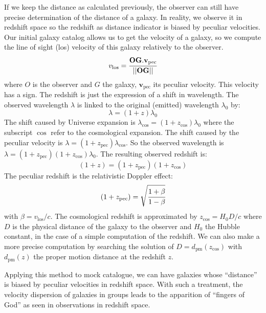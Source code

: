 If we keep the distance as calculated previously, the observer can still have
precise determination of the distance of a galaxy. In reality, we observe it in
redshift space so the redshift as distance indicator is biased by peculiar
velocities. Our initial galaxy catalog allows us to get the velocity of a
galaxy, so we compute the line of sight (los) velocity of this galaxy
relatively to the observer.
%
\begin{equation}
v_\mathrm{los}=\cfrac{\textbf{OG}.\textbf{v}_\mathrm{pec}}
    {\left|\left|\textbf{OG}\right|\right|}
\end{equation}
%
where $O$ is the observer and $G$ the galaxy, $\textbf{v}_{\mathrm{pec}}$ its
peculiar velocity. This velocity has a sign. The redshift is just the
expression of a shift in wavelength. The observed wavelength $\lambda$ is
linked to the original (emitted) wavelength $\lambda_0$ by:
%
\begin{equation}
    \lambda=(1+z)\lambda_0
\end{equation}
%
The shift caused by Universe expansion is
$\lambda_{\cos}=(1+z_{\cos})\lambda_0$ where the subscript $\cos$ refer to the
cosmological expansion. The shift caused by the peculiar velocity is
$\lambda=(1+z_{\mathrm{pec}})\lambda_{\cos}$. So the observed wavelength is
$\lambda=(1+z_{\mathrm{pec}})(1+z_{\cos})\lambda_0$. The resulting observed
redshift is:
%
\begin{equation}
    (1+z)=(1+z_{\mathrm{pec}})(1+z_{\cos})
\end{equation}
%
The peculiar redshift is the relativistic Doppler effect:
%
\begin{equation}
    (1+z_{\mathrm{pec}})=\sqrt{\cfrac{1+\beta}{1-\beta}}
\end{equation}
%
with $\beta={v_{\mathrm{los}}}/{c}$. The cosmological redshift is approximated
by $z_{\cos}={H_0}{D}/c$ where $D$ is the physical distance of the galaxy to
the observer and $H_0$ the Hubble constant, in the case of a simple computation
of the redshift. We can also make a more precise computation by searching the
solution of $D=d_\mathrm{pm} \left(z_{\cos}\right)$ with $d_\mathrm{pm}
\left(z\right)$ the proper motion distance at the redshift $z$.

Applying this method to mock catalogue, we can have galaxies whose ``distance''
is biased by peculiar velocities in redshift space. With such a treatment, the
velocity dispersion of galaxies in groups leads to the apparition of ``fingers
of God'' as seen in observations in redshift space.

